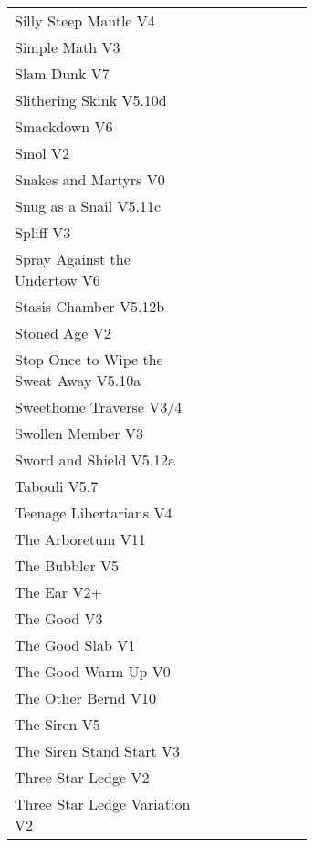 \begin{flushleft}
\begin{center}
\begin{supertabular}{p{0.65\linewidth}r}
Silly Steep Mantle V4 & \pageref{rt:Silly Steep Mantle} \\
Simple Math V3 & \pageref{rt:Simple Math} \\
Slam Dunk V7 & \pageref{rt:Slam Dunk} \\
Slithering Skink V5.10d & \pageref{rt:Slithering Skink} \\
Smackdown V6 & \pageref{rt:Smackdown} \\
Smol V2 & \pageref{rt:Smol} \\
Snakes and Martyrs V0 & \pageref{rt:Snakes and Martyrs} \\
Snug as a Snail V5.11c & \pageref{rt:Snug as a Snail} \\
Spliff V3 & \pageref{rt:Spliff} \\
Spray Against the Undertow V6 & \pageref{vr:Spray Against the Undertow} \\
Stasis Chamber V5.12b & \pageref{rt:Stasis Chamber} \\
Stoned Age V2 & \pageref{rt:Stoned Age} \\
Stop Once to Wipe the Sweat Away V5.10a & \pageref{rt:Stop Once to Wipe the Sweat Away} \\
Sweethome Traverse V3/4 & \pageref{vr:Sweethome Traverse} \\
Swollen Member V3 & \pageref{rt:Swollen Member} \\
Sword and Shield V5.12a & \pageref{rt:Sword and Shield} \\
Tabouli V5.7 & \pageref{rt:Tabouli} \\
Teenage Libertarians V4 & \pageref{rt:Teenage Libertarians} \\
The Arboretum V11 & \pageref{rt:The Arboretum} \\
The Bubbler V5 & \pageref{rt:The Bubbler} \\
The Ear V2+ & \pageref{rt:The Ear} \\
The Good V3 & \pageref{rt:The Good} \\
The Good Slab V1 & \pageref{rt:The Good Slab} \\
The Good Warm Up V0 & \pageref{rt:The Good Warm Up} \\
The Other Bernd V10 & \pageref{rt:The Other Bernd} \\
The Siren V5 & \pageref{rt:The Siren} \\
The Siren Stand Start V3 & \pageref{vr:The Siren Stand Start} \\
Three Star Ledge V2 & \pageref{rt:Three Star Ledge} \\
Three Star Ledge Variation V2 & \pageref{vr:Three Star Ledge Variation} \\

\end{supertabular}
\end{center}
\end{flushleft}
